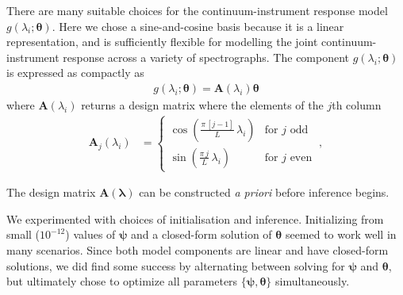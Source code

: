 \documentclass[modern]{aastex631}
\renewcommand{\vec}[1]{\mathbf{#1}}
\newcommand{\vectheta}{\boldsymbol{\theta}}
\newcommand{\vecpsi}{\boldsymbol{\psi}}
\begin{document}
There are many suitable choices for the continuum-instrument response model $g(\lambda_i;\vectheta)$. Here we chose a sine-and-cosine basis because it is a linear representation, and is sufficiently flexible for modelling the joint continuum-instrument response across a variety of spectrographs. The component $g(\lambda_i;\vectheta)$ is expressed as compactly as
\begin{align}
    g(\lambda_i;\vectheta) = \vec{A}(\lambda_i)\vectheta
\end{align}
where $\vec{A}(\lambda_i)$ returns a design matrix where the elements of the $j$th column
\begin{align}
    \vec{A}_{j}(\lambda_i) & = \left\{\begin{array}{cl}\displaystyle\cos\left(\frac{\pi\,[j-1]}{L}\,\lambda_i\right) & \mbox{for $j$ odd} \\[3ex]
                                       \displaystyle\sin\left(\frac{\pi\,j}{L}\,\lambda_i\right) & \mbox{for $j$ even}\end{array}\right. ~,
\end{align}

The design matrix $\vec{A}(\vec{\lambda})$ can be constructed \emph{a priori} before inference begins.



We experimented with choices of initialisation and inference. Initializing from small ($10^{-12}$) values of $\vecpsi$ and a closed-form solution of $\vectheta$ seemed to work well in many scenarios. Since both model components are linear and have closed-form solutions, we did find some success by alternating between solving for $\vecpsi$ and $\vectheta$, but ultimately chose to optimize all parameters $\{\vecpsi,\vectheta\}$ simultaneously.  
\end{document}
